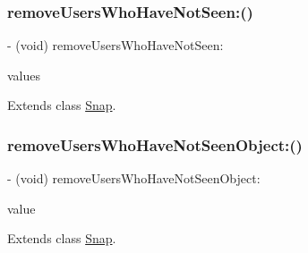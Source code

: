 \subsubsection{\texorpdfstring{remove\+Users\+Who\+Have\+Not\+Seen\+:()}{removeUsersWhoHaveNotSeen:()}}
{\footnotesize\ttfamily -\/ (void) remove\+Users\+Who\+Have\+Not\+Seen\+: \begin{DoxyParamCaption}\item[{(N\+S\+Set$<$ \hyperlink{interface_friend}{Friend} $\ast$ $>$ $\ast$)}]{values }\end{DoxyParamCaption}}



Extends class \hyperlink{interface_snap_aab479d17ca768b4132fbb78faded55fb}{Snap}.

\hypertarget{category_snap_07_core_data_generated_accessors_08_a05c43e998f06072a2768e7db4b34a04d}{}\label{category_snap_07_core_data_generated_accessors_08_a05c43e998f06072a2768e7db4b34a04d} 
\subsubsection{\texorpdfstring{remove\+Users\+Who\+Have\+Not\+Seen\+Object\+:()}{removeUsersWhoHaveNotSeenObject:()}}
{\footnotesize\ttfamily -\/ (void) remove\+Users\+Who\+Have\+Not\+Seen\+Object\+: \begin{DoxyParamCaption}\item[{(\hyperlink{interface_friend}{Friend} $\ast$)}]{value }\end{DoxyParamCaption}}



Extends class \hyperlink{interface_snap_a05c43e998f06072a2768e7db4b34a04d}{Snap}.

\hypertarget{category_snap_07_core_data_generated_accessors_08_af4fa1e8b7b4cdd429c312312704b61ab}{}\label{category_snap_07_core_data_generated_accessors_08_af4fa1e8b7b4cdd429c312312704b61ab} 
